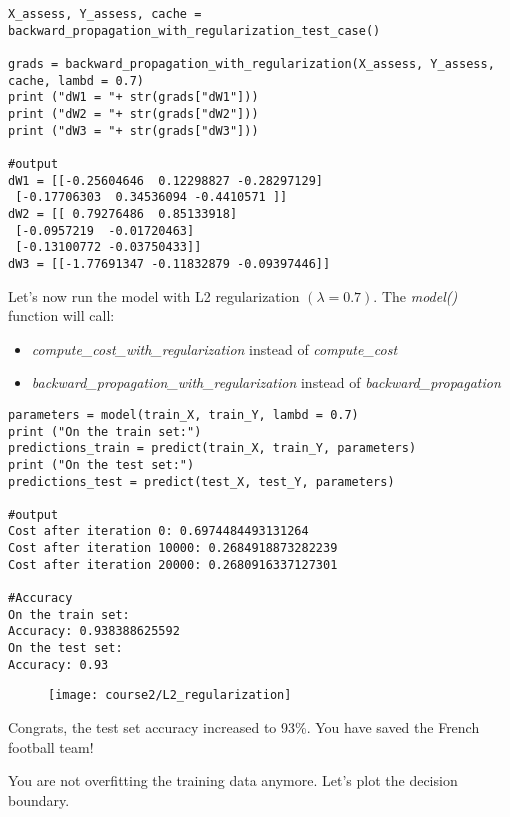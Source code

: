 \begin{verbatim}
X_assess, Y_assess, cache = backward_propagation_with_regularization_test_case()

grads = backward_propagation_with_regularization(X_assess, Y_assess, cache, lambd = 0.7)
print ("dW1 = "+ str(grads["dW1"]))
print ("dW2 = "+ str(grads["dW2"]))
print ("dW3 = "+ str(grads["dW3"]))

#output
dW1 = [[-0.25604646  0.12298827 -0.28297129]
 [-0.17706303  0.34536094 -0.4410571 ]]
dW2 = [[ 0.79276486  0.85133918]
 [-0.0957219  -0.01720463]
 [-0.13100772 -0.03750433]]
dW3 = [[-1.77691347 -0.11832879 -0.09397446]]

\end{verbatim}

Let's now run the model with L2 regularization $(\lambda = 0.7)$. The \emph{model()} function will call: 
\begin{itemize}
\item \emph{compute\_cost\_with\_regularization} instead of \emph{compute\_cost}
\item \emph{backward\_propagation\_with\_regularization} instead of \emph{backward\_propagation}
\end{itemize}

\begin{verbatim}
parameters = model(train_X, train_Y, lambd = 0.7)
print ("On the train set:")
predictions_train = predict(train_X, train_Y, parameters)
print ("On the test set:")
predictions_test = predict(test_X, test_Y, parameters)

#output
Cost after iteration 0: 0.6974484493131264
Cost after iteration 10000: 0.2684918873282239
Cost after iteration 20000: 0.2680916337127301

#Accuracy
On the train set:
Accuracy: 0.938388625592
On the test set:
Accuracy: 0.93
\end{verbatim}

\vspace{-0.7cm}
\begin{figure}[h]
\begin{center}
\texttt{[image: course2/L2\_regularization]}
\end{center}
\end{figure}
\vspace{-0.7cm}

Congrats, the test set accuracy increased to 93\%. You have saved the French football team!

You are not overfitting the training data anymore. Let's plot the decision boundary.


